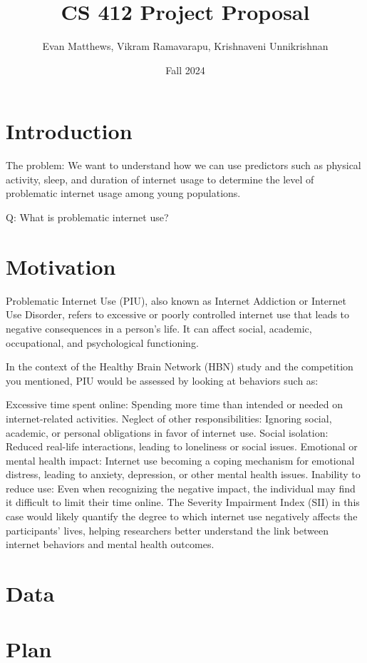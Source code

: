 \documentclass[12pt]{extarticle}
\title{CS 412 Project Proposal}
\author{Evan Matthews, Vikram Ramavarapu, Krishnaveni Unnikrishnan}
\date{Fall 2024}
\begin{document}
\maketitle

\section{Introduction}

The problem: We want to understand how we can use predictors such as physical activity, sleep, and duration of internet usage to determine the level of problematic internet usage among young populations.

Q: What is problematic internet use? 

\section{Motivation}

Problematic Internet Use (PIU), also known as Internet Addiction or Internet Use Disorder, refers to excessive or poorly controlled internet use that leads to negative consequences in a person's life. It can affect social, academic, occupational, and psychological functioning.

In the context of the Healthy Brain Network (HBN) study and the competition you mentioned, PIU would be assessed by looking at behaviors such as:

Excessive time spent online: Spending more time than intended or needed on internet-related activities.
Neglect of other responsibilities: Ignoring social, academic, or personal obligations in favor of internet use.
Social isolation: Reduced real-life interactions, leading to loneliness or social issues.
Emotional or mental health impact: Internet use becoming a coping mechanism for emotional distress, leading to anxiety, depression, or other mental health issues.
Inability to reduce use: Even when recognizing the negative impact, the individual may find it difficult to limit their time online.
The Severity Impairment Index (SII) in this case would likely quantify the degree to which internet use negatively affects the participants' lives, helping researchers better understand the link between internet behaviors and mental health outcomes.

\section{Data}

\section{Plan}



\end{document}
